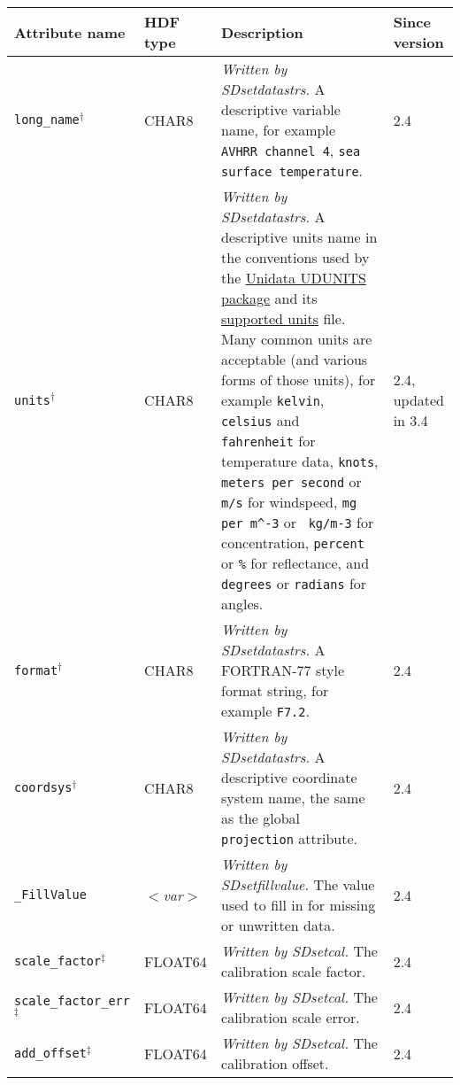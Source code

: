 \begin{tabular}{|l|l|p{7.5cm}|l|}

  \hline 

  Attribute name & HDF type & Description & Since version \\ \hline

  {\tt long\_name}$^{\dagger}$ & CHAR8 & {\em Written
  by SDsetdatastrs.} A descriptive variable name, for example {\tt
  AVHRR channel 4}, {\tt sea surface temperature}. &2.4 \\ \hline

  {\tt units}$^{\dagger}$ & CHAR8 & {\em Written by SDsetdatastrs.} A
  descriptive units name in the conventions used by the 
  \href{https://www.google.com/search?q=udunits}{Unidata UDUNITS package} 
  and its \href{https://www.google.com/search?q=udunits.txt}{supported
  units} file.  Many common units are acceptable (and various forms of
  those units), for example {\tt kelvin}, {\tt celsius} and {\tt
  fahrenheit} for temperature data, {\tt knots}, {\tt meters per
  second} or {\tt m/s} for windspeed, {\tt mg per m\^{}-3} or {\tt
  kg/m-3} for concentration, {\tt percent} or {\tt \%} for
  reflectance, and {\tt degrees} or {\tt radians} for angles. & 2.4,
  updated in 3.4 \\ \hline

  {\tt format}$^{\dagger}$ & CHAR8 & {\em Written by SDsetdatastrs.} A
  FORTRAN-77 style format string, for example {\tt F7.2}. & 2.4 \\
  \hline

  {\tt coordsys}$^{\dagger}$ & CHAR8 & {\em Written by SDsetdatastrs.}
  A descriptive coordinate system name, the same as the global {\tt
  projection} attribute. & 2.4 \\ \hline

  {\tt \_FillValue} & {\it $<$var$>$} & {\em Written by
  SDsetfillvalue.} The value used to fill in for missing or unwritten
  data. & 2.4 \\ \hline

  {\tt scale\_factor}$^{\ddagger}$ & FLOAT64 & {\em Written by
  SDsetcal.} The calibration scale factor. & 2.4 \\ \hline

  {\tt scale\_factor\_err}$^{\ddagger}$ & FLOAT64 & {\em Written by
  SDsetcal.} The calibration scale error. & 2.4 \\ \hline

  {\tt add\_offset}$^{\ddagger}$ & FLOAT64 & {\em Written by
  SDsetcal.} The calibration offset. & 2.4 \\ \hline


\end{tabular}

